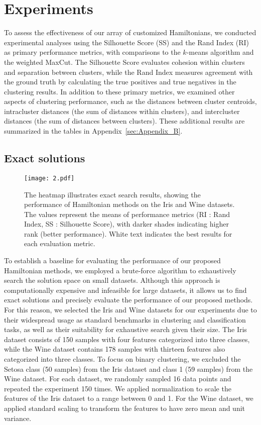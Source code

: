 \documentclass[showpacs,twocolumn,superscriptaddress]{revtex4-2}
\begin{document}
\section{Experiments}\label{sec:Experiments}
To assess the effectiveness of our array of customized Hamiltonians, we conducted experimental analyses using the Silhouette Score (SS) and the Rand Index (RI) as primary performance metrics, with comparisons to the $k$-means algorithm and the weighted MaxCut. The Silhouette Score evaluates cohesion within clusters and separation between clusters, while the Rand Index measures agreement with the ground truth by calculating the true positives and true negatives in the clustering results. In addition to these primary metrics, we examined other aspects of clustering performance, such as the distances between cluster centroids, intracluster distances (the sum of distances within clusters), and intercluster distances (the sum of distances between clusters). These additional results are summarized in the tables in Appendix~\ref{sec:Appendix_B}.

\subsection{Exact solutions}
\begin{figure}[t]
    \begin{center}
    \texttt{[image: 2.pdf]}    
    \end{center}
    \caption{The heatmap illustrates exact search results, showing the performance of Hamiltonian methods on the Iris and Wine datasets. The values represent the means of performance metrics (RI : Rand Index, SS : Silhouette Score), with darker shades indicating higher rank (better performance). White text indicates the best results for each evaluation metric.}\label{fig:2}
\end{figure}
To establish a baseline for evaluating the performance of our proposed Hamiltonian methods, we employed a brute-force algorithm to exhaustively search the solution space on small datasets. Although this approach is computationally expensive and infeasible for large datasets, it allows us to find exact solutions and precisely evaluate the performance of our proposed methods. For this reason, we selected the Iris and Wine datasets for our experiments due to their widespread usage as standard benchmarks in clustering and classification tasks, as well as their suitability for exhaustive search given their size. The Iris dataset consists of 150 samples with four features categorized into three classes, while the Wine dataset contains 178 samples with thirteen features also categorized into three classes. To focus on binary clustering, we excluded the Setosa class (50 samples) from the Iris dataset and class 1 (59 samples) from the Wine dataset. For each dataset, we randomly sampled 16 data points and repeated the experiment 150 times. We applied normalization to scale the features of the Iris dataset to a range between 0 and 1. For the Wine dataset, we applied standard scaling to transform the features to have zero mean and unit variance.
\end{document}
